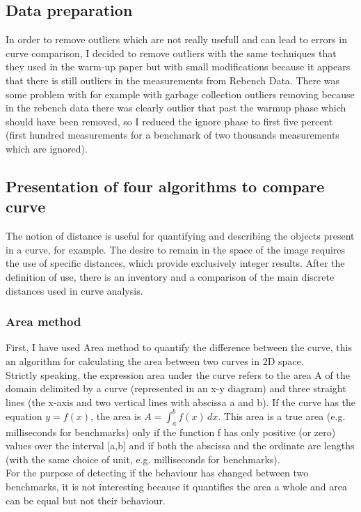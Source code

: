\documentclass{article}
\begin{document}
\subsection{Data preparation}

In order to remove outliers which are not really usefull and can lead to errors in curve comparison, I decided to remove outliers with the same techniques that they used in the warm-up paper but with small modifications because it appears that there is still outliers in the measurements from Rebench Data. There was some problem with for example with garbage collection outliers removing because in the rebench data there was clearly outlier that past the warmup phase which should have been removed, so I reduced the ignore phase to first five percent (first hundred measurements for a benchmark of two thousands measurements which are ignored).


\subsection{Presentation of four algorithms to compare curve}

The notion of distance is useful for quantifying and describing the objects present in
a curve, for example. The desire to remain in the space of the image requires the use of specific distances, which provide exclusively integer results. After the definition of use, there is an inventory and a comparison of the main discrete distances used in curve analysis.

\subsubsection{Area method}

First, I have used Area \citep{jekel2019similarity} method to quantify the difference between the curve, this an algorithm for calculating the area between two curves in 2D space.\\
Strictly speaking, the expression area under the curve refers to the area A of the domain delimited by a curve (represented in an x-y diagram) and three straight lines (the x-axis and two vertical lines with abscissa a and b). If the curve has the equation $y=f(x)$, the area is $A=\int _{a}^{b}f(x)\, {d} x$. This area is a true area (e.g. milliseconds for benchmarks) only if the function f has only positive (or zero) values over the interval [a,b] and if both the abscissa and the ordinate are lengths (with the same choice of unit, e.g. milliseconds for benchmarks).\\
For the purpose of detecting if the behaviour has changed between two benchmarks, it is not interesting because it quantifies the area a whole and area can be equal but not their behaviour.
\end{document}
